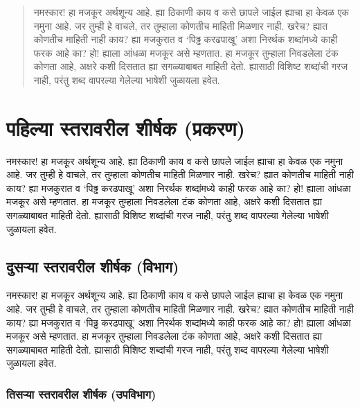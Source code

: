\maketitle

\begin{abstract}
नमस्कार! हा मजकूर अर्थशून्य आहे. ह्या ठिकाणी काय व कसे छापले जाईल ह्याचा हा केवळ एक नमुना
आहे. जर तुम्ही हे वाचले, तर तुम्हाला कोणतीच माहिती मिळणार नाही. खरेच? ह्यात कोणतीच माहिती
नाही काय? ह्या मजकुरात व `पिढ्ढ करढपाखू' अशा निरर्थक शब्दांमध्ये काही फरक आहे का? हो!
ह्याला आंधळा मजकूर असे म्हणतात. हा मजकूर तुम्हाला निवडलेला टंक कोणता आहे, अक्षरे कशी दिसतात
ह्या सगळ्याबाबत माहिती देतो. ह्यासाठी विशिष्ट शब्दांची गरज नाही, परंतु शब्द वापरल्या गेलेल्या
भाषेशी जुळायला हवेत.
\end{abstract}

\tableofcontents

\chapter{पहिल्या स्तरावरील शीर्षक (प्रकरण)}

नमस्कार! हा मजकूर अर्थशून्य आहे. ह्या ठिकाणी काय व कसे छापले जाईल ह्याचा हा केवळ एक नमुना
आहे. जर तुम्ही हे वाचले, तर तुम्हाला कोणतीच माहिती मिळणार नाही. खरेच? ह्यात कोणतीच माहिती
नाही काय? ह्या मजकुरात व `पिढ्ढ करढपाखू' अशा निरर्थक शब्दांमध्ये काही फरक आहे का? हो!
ह्याला आंधळा मजकूर असे म्हणतात. हा मजकूर तुम्हाला निवडलेला टंक कोणता आहे, अक्षरे कशी दिसतात
ह्या सगळ्याबाबत माहिती देतो. ह्यासाठी विशिष्ट शब्दांची गरज नाही, परंतु शब्द वापरल्या गेलेल्या
भाषेशी जुळायला हवेत.

\section{दुसऱ्या स्तरावरील शीर्षक (विभाग)}

नमस्कार! हा मजकूर अर्थशून्य आहे. ह्या ठिकाणी काय व कसे छापले जाईल ह्याचा हा केवळ एक नमुना
आहे. जर तुम्ही हे वाचले, तर तुम्हाला कोणतीच माहिती मिळणार नाही. खरेच? ह्यात कोणतीच माहिती
नाही काय? ह्या मजकुरात व `पिढ्ढ करढपाखू' अशा निरर्थक शब्दांमध्ये काही फरक आहे का? हो!
ह्याला आंधळा मजकूर असे म्हणतात. हा मजकूर तुम्हाला निवडलेला टंक कोणता आहे, अक्षरे कशी दिसतात
ह्या सगळ्याबाबत माहिती देतो. ह्यासाठी विशिष्ट शब्दांची गरज नाही, परंतु शब्द वापरल्या गेलेल्या
भाषेशी जुळायला हवेत.

\subsection{तिसऱ्या स्तरावरील शीर्षक (उपविभाग)}

